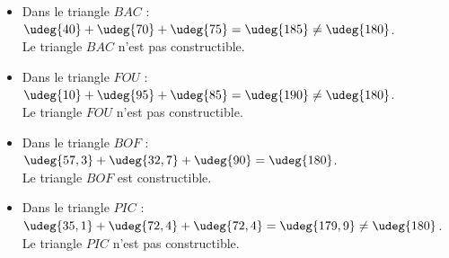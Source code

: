  \begin{itemize}
     \item Dans le triangle $BAC$ : \\
        $\udeg{40}+\udeg{70}+\udeg{75} =\udeg{185} \neq \udeg{180}$. \\
        {\red Le triangle $BAC$ n'est pas constructible}.
     \item Dans le triangle $FOU$ : \\
        $\udeg{10}+\udeg{95}+\udeg{85} =\udeg{190} \neq \udeg{180}$. \\
        {\red Le triangle $FOU$ n'est pas constructible}.
     \item Dans le triangle $BOF$ : \\
        $\udeg{57,3}+\udeg{32,7}+\udeg{90} =\udeg{180}$. \\
        {\red Le triangle $BOF$ est constructible}.
     \item Dans le triangle $PIC$ : \\
        $\udeg{35,1}+\udeg{72,4}+\udeg{72,4} =\udeg{179,9} \neq \udeg{180}$. \\
        {\red Le triangle $PIC$ n'est pas constructible}.
  \end{itemize}
